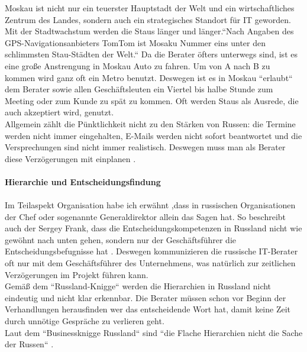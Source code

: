 	 Moskau ist nicht nur ein teuerster Hauptstadt der Welt und ein wirtschaftliches Zentrum des Landes, sondern auch ein strategisches Standort für IT geworden.
	 Mit der Stadtwachstum werden die Staus länger und länger.``Nach Angaben des GPS-Navigationsanbieters TomTom ist Mosaku Nummer eins unter den schlimmsten Stau-Städten der Welt\cite{MoskauStau1}.``
	 Da die Berater öfters unterwegs sind, ist es eine große Anstrengung in Moskau Auto zu fahren. Um von A nach B zu kommen wird ganz oft ein Metro benutzt. 
	 Deswegen ist es in Moskau ``erlaubt`` dem Berater sowie allen Geschäftsleuten ein Viertel bis halbe Stunde zum Meeting oder zum  Kunde zu spät zu kommen. Oft werden Staus als Ausrede, die auch akzeptiert wird, genutzt.\\
	 Allgemein zählt die Pünktlichkeit nicht zu den Stärken von Russen: die Termine werden nicht immer eingehalten, E-Mails werden nicht sofort beantwortet und die Versprechungen sind nicht immer realistisch. Deswegen muss man als Berater diese Verzögerungen mit einplanen \cite{RusKnigge}.\\ \\
	 	 \textbf{Hierarchie und Entscheidungsfindung}\\
	 	 \\
	 Im Teilaspekt Organisation habe ich erwähnt ,dass in russischen Organisationen der Chef oder sogenannte Generaldirektor  allein das Sagen hat. So beschreibt auch der Sergey Frank, dass die Entscheidungskompetenzen in Russland nicht wie gewöhnt nach unten gehen, sondern nur der Geschäftsführer die Entscheidungsbefugnisse hat \cite{RuSFI}.
	 Deswegen kommunizieren die russische IT-Berater oft nur mit dem Geschäftsführer des Unternehmens, was natürlich zur zeitlichen Verzögerungen im Projekt führen kann.\\
	 Gemäß dem ``Russland-Knigge`` \cite{RusKnigge} werden die Hierarchien in Russland nicht eindeutig und nicht klar erkennbar. Die Berater müssen schon vor Beginn der Verhandlungen herausfinden wer das entscheidende Wort hat, damit keine Zeit durch unnötige Gespräche zu verlieren geht.\\
	 Laut dem ``Businessknigge Russland`` sind ``die Flache Hierarchien nicht die Sache der Russen`` \cite{RusKnigge}. 
	
